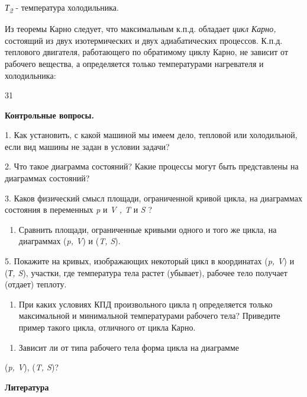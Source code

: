 \emph{Т\textsubscript{2}} - температура холодильника.

Из теоремы Карно следует, что максимальным к.п.д. обладает \emph{цикл
Карно,} состоящий из двух изотермических и двух адиабатических
процессов. К.п.д. теплового двигателя, работающего по обратимому циклу
Карно, не зависит от рабочего вещества, а определяется только
температурами нагревателя и холодильника:

31


\textbf{Контрольные вопросы.}

1. Как установить, с какой машиной мы имеем дело, тепловой или
холодильной, если вид машины не задан в условии задачи?

2. Что такое диаграмма состояний? Какие процессы могут быть представлены
на диаграммах состояний?

3. Каков физический смысл площади, ограниченной кривой цикла, на
диаграммах состояния в переменных \emph{p} и \emph{V , T} и \emph{S} ?

\begin{enumerate}
\def\labelenumi{\arabic{enumi}.}
\setcounter{enumi}{3}
\item
  Сравнить площади, ограниченные кривыми одного и того же цикла, на
  диаграммах (\emph{p, V}) и (\emph{T, S}).
\end{enumerate}

5. Покажите на кривых, изображающих некоторый цикл в координатах
(\emph{p, V}) и (\emph{Т, S}), участки, где температура тела растет
(убывает), рабочее тело получает (отдает) теплоту.

\begin{enumerate}
\def\labelenumi{\arabic{enumi}.}
\setcounter{enumi}{5}
\item
  При каких условиях КПД произвольного цикла η определяется только
  максимальной и минимальной температурами рабочего тела? Приведите
  пример такого цикла, отличного от цикла Карно.
\end{enumerate}

\begin{enumerate}
\def\labelenumi{\arabic{enumi}.}
\setcounter{enumi}{5}
\item
  Зависит ли от типа рабочего тела форма цикла на диаграмме
\end{enumerate}

(\emph{p, V}), (\emph{T, S})?

\textbf{Литература}


